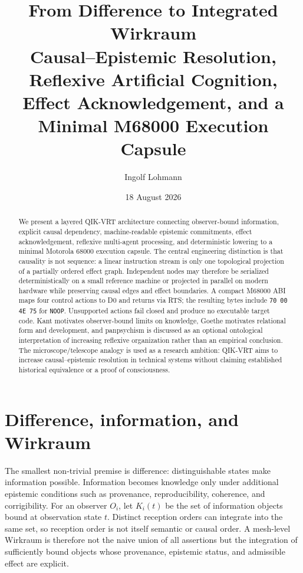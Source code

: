 \documentclass[11pt,a4paper]{article}
\title{\textbf{From Difference to Integrated Wirkraum}\\Causal--Epistemic Resolution, Reflexive Artificial Cognition,\\Effect Acknowledgement, and a Minimal M68000 Execution Capsule}
\author{Ingolf Lohmann}
\date{18 August 2026}
\begin{document}
\maketitle
\begin{abstract}
We present a layered QIK-VRT architecture connecting observer-bound information, explicit causal dependency, machine-readable epistemic commitments, effect acknowledgement, reflexive multi-agent processing, and deterministic lowering to a minimal Motorola 68000 execution capsule. The central engineering distinction is that causality is not sequence: a linear instruction stream is only one topological projection of a partially ordered effect graph. Independent nodes may therefore be serialized deterministically on a small reference machine or projected in parallel on modern hardware while preserving causal edges and effect boundaries. A compact M68000 ABI maps four control actions to D0 and returns via RTS; the resulting bytes include \texttt{70 00 4E 75} for \texttt{NOOP}. Unsupported actions fail closed and produce no executable target code. Kant motivates observer-bound limits on knowledge, Goethe motivates relational form and development, and panpsychism is discussed as an optional ontological interpretation of increasing reflexive organization rather than an empirical conclusion. The microscope/telescope analogy is used as a research ambition: QIK-VRT aims to increase causal--epistemic resolution in technical systems without claiming established historical equivalence or a proof of consciousness.
\end{abstract}

\section{Difference, information, and Wirkraum}
The smallest non-trivial premise is difference: distinguishable states make information possible. Information becomes knowledge only under additional epistemic conditions such as provenance, reproducibility, coherence, and corrigibility. For an observer $O_i$, let $K_i(t)$ be the set of information objects bound at observation state $t$. Distinct reception orders can integrate into the same set, so reception order is not itself semantic or causal order. A mesh-level Wirkraum is therefore not the naive union of all assertions but the integration of sufficiently bound objects whose provenance, epistemic status, and admissible effect are explicit.
\end{document}
